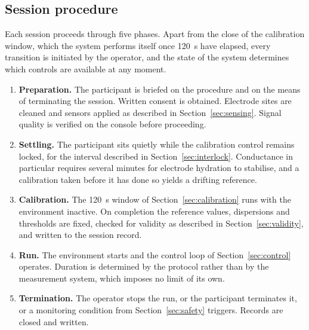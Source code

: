 \subsection{Session procedure}
\label{sec:procedure}

Each session proceeds through five phases. Apart from the close of
the calibration window, which the system performs itself once
120~s have elapsed, every transition is initiated by the operator,
and the state of the system determines which controls are
available at any moment.

\begin{enumerate}
    \item \textbf{Preparation.} The participant is briefed on the
    procedure and on the means of terminating the session.
    Written consent is obtained. Electrode sites are cleaned and
    sensors applied as described in Section~\ref{sec:sensing}.
    Signal quality is verified on the console before proceeding.
    \item \textbf{Settling.} The participant sits quietly while
    the calibration control remains locked, for the interval
    described in Section~\ref{sec:interlock}. Conductance in
    particular requires several minutes for electrode hydration
    to stabilise, and a calibration taken before it has done so
    yields a drifting reference.
    \item \textbf{Calibration.} The 120~s window of
    Section~\ref{sec:calibration} runs with the environment
    inactive. On completion the reference values, dispersions and
    thresholds are fixed, checked for validity as described in
    Section~\ref{sec:validity}, and written to the session record.
    \item \textbf{Run.} The environment starts and the control
    loop of Section~\ref{sec:control} operates. Duration is
    determined by the protocol rather than by the measurement
    system, which imposes no limit of its own.
    \item \textbf{Termination.} The operator stops the run, or
    the participant terminates it, or a monitoring condition from
    Section~\ref{sec:safety} triggers. Records are closed and
    written.
\end{enumerate}

